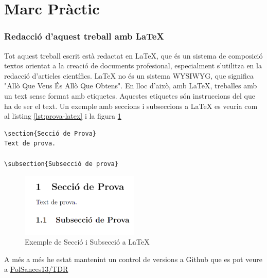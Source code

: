 \part*{Marc Pràctic}

\section{Redacció d'aquest treball amb \LaTeX}

Tot aquest treball escrit està redactat en LaTeX, que és un sistema de composició textos orientat a la creació de documents profesional, especialment s'utilitza en la redacció d'articles científics.
LaTeX no és un sistema WYSIWYG, que significa "Allò Que Veus És Allò Que Obtens". En lloc d'això, amb LaTeX, treballes amb un text sense format amb etiquetes. Aquestes etiquetes són instruccions del que ha de ser el text.
Un exemple amb seccions i subseccions a LaTeX es veuria com al listing \ref{lst:prova-latex} i la figura \ref{fig:prova-latex}

\begin{lstlisting}[style=latex, caption={Exemple de Secció i Subsecció a LaTeX}, label={lst:prova-latex}]
\section{Secció de Prova}
Text de prova.

\subsection{Subsecció de prova}

\end{lstlisting}

\begin{figure}[h]
    \centering
    \includegraphics[width=0.5\textwidth]{img/figures/prova-codi-latex.png}
    \caption{Exemple de Secció i Subsecció a LaTeX}
    \label{fig:prova-latex}
\end{figure}


A més a més he estat mantenint un control de versions a Github que es pot veure a \href{https://github.com/PolSances13/TDR}{PolSances13/TDR}

